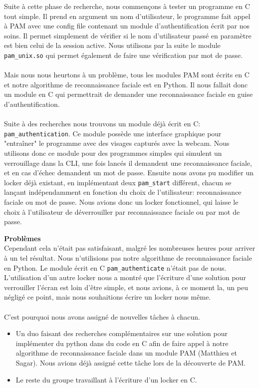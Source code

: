 \documentclass[french]{report}
\begin{document}
  Suite à cette phase de recherche, nous commençons à tester un programme en C
  tout simple. Il prend en argument un nom d’utilisateur, le programme fait
  appel à PAM avec une config file contenant un module d’authentification écrit
  par nos soins. Il permet simplement de vérifier si le nom d’utilisateur passé
  en paramètre est bien celui de la session active. Nous utilisons par la suite
  le module \texttt{pam\_unix.so} qui permet également de faire une
  vérification par mot de passe.
\\ \\
  Mais nous nous heurtons à un problème, tous les modules PAM sont écrits en C
  et notre algorithme de reconnaissance faciale est en Python. Il nous fallait
  donc un module en C qui permettrait de demander une reconnaissance faciale en
  guise d’authentification.
\\ \\
  Suite à des recherches nous trouvons un module déjà écrit en C:
\texttt{pam\_authentication}. Ce module possède une interface
graphique pour "entraîner" le programme avec des visages capturés avec la
webcam. Nous utilisons donc ce module pour des programmes simples qui simulent un
verrouillage dans la CLI,  une fois lancés il demandent une reconnaissance faciale,
et en cas d’échec demandent un mot de passe. Ensuite nous avons pu modifier un
locker déjà existant, en implémentant deux \texttt{pam\_start} différent,
chacun se lançant indépendamment en fonction du choix de l’utilisateur:
reconnaissance faciale ou mot de passe. Nous avions donc un locker fonctionnel,
qui laisse le choix à l’utilisateur de déverrouiller par reconnaissance faciale
ou par mot de passe.

\vspace{0.5cm}

  \textbf{Problèmes}\\

  Cependant cela n’était pas satisfaisant, malgré les nombreuses heures pour
  arriver à un tel résultat. Nous n’utilisions pas notre algorithme de
  reconnaissance faciale en Python. Le module écrit en C
  \texttt{pam\_authenticate} n’était pas de nous. L’utilisation d’un autre
  locker nous a montré que l’écriture d’une solution pour verrouiller l’écran
  est loin d’être simple, et nous avions, à ce moment la, un peu négligé ce
  point, mais nous souhaitions écrire un locker nous même.
\\ \\
  C’est pourquoi nous avons assigné de nouvelles tâches à chacun.
  \begin{itemize}[label=\textbullet, font=\normalfont \color{blue}]
    \item{Un duo faisant des recherches complémentaires sur une
  solution pour implémenter du python dans du code en C afin de faire appel à
  notre algorithme de reconnaissance faciale dans un module PAM (Matthieu et
  Sagar). Nous avions déjà assigné cette tâche lors de la découverte de PAM.}
    \item{Le reste du groupe travaillant à l’écriture d’un locker en C.}
  \end{itemize}
\end{document}
